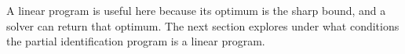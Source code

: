 A linear program is useful here because its optimum is the sharp bound, and a solver can return that optimum. The next section explores under what conditions the partial identification program is a linear program.








